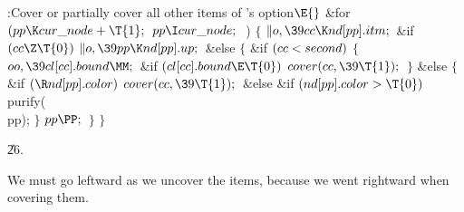 \B{}:Cover or partially cover all other items of 's
option\X${}\E{}$\6
\&{for} ${}(\\{pp}\K\\{cur\_node}+\T{1};{}$ ${}\\{pp}\I\\{cur\_node};{}$ \,)\5
${}\{{}$\1\6
${}\|o,\39\\{cc}\K\\{nd}[\\{pp}].\\{itm};{}$\6
\&{if} ${}(\\{cc}\Z\T{0}){}$\1\5
${}\|o,\39\\{pp}\K\\{nd}[\\{pp}].\\{up};{}$\2\6
\&{else}\5
${}\{{}$\1\6
\&{if} ${}(\\{cc}<\\{second}){}$\5
${}\{{}$\1\6
${}\\{oo},\39\\{cl}[\\{cc}].\\{bound}\MM;{}$\6
\&{if} ${}(\\{cl}[\\{cc}].\\{bound}\E\T{0}){}$\1\5
${}\\{cover}(\\{cc},\39\T{1});{}$\2\6
\4${}\}{}$\5
\2\&{else}\5
${}\{{}$\1\6
\&{if} ${}(\R\\{nd}[\\{pp}].\\{color}){}$\1\5
${}\\{cover}(\\{cc},\39\T{1});{}$\2\6
\&{else} \&{if} ${}(\\{nd}[\\{pp}].\\{color}>\T{0}){}$\1\5
\\{purify}(\\{pp});\2\6
\4${}\}{}$\2\6
${}\\{pp}\PP;{}$\6
\4${}\}{}$\2\6
\4${}\}{}$\2\par
\U26.\fi

We must go leftward as we uncover the items, because we went
rightward when covering them.

